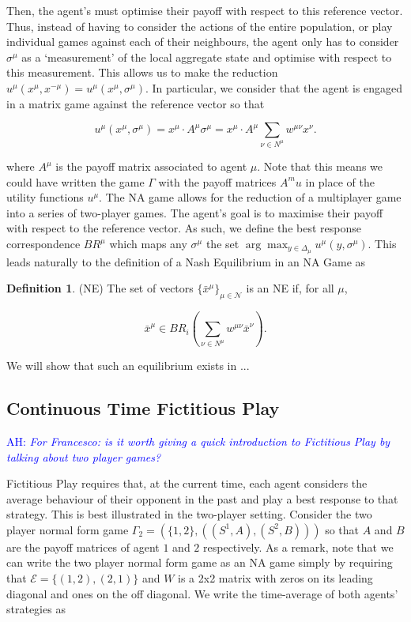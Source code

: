 \documentclass{article}
\theoremstyle{definition}
\newtheorem*{definition}{Definition}
\newcommand{\ah}[1]{\textcolor{blue}{AH: \textit{#1}}}
\newcommand{\agentset}{\mathcal{N}}
\newcommand{\edgeset}{\mathcal{E}}
\newcommand{\weightset}{W}
\newcommand{\utility}[1]{u^{#1}}
\newcommand{\wmunu}{w^{\mu \nu}}
\newcommand{\xmu}{x^{\mu}}
\newcommand{\xnu}{x^{\nu}}
\newcommand{\refmu}{\sigma^{\mu}}
\newcommand{\NE}[1]{\bar{x}^{#1}}
\newcommand{\weightedsum}{ \sum_{\nu \in N^\mu} \wmunu \xnu}
\newcommand{\xnotmu}{x^{-\mu}}
\begin{document}
	Then, the agent's must optimise their payoff with respect to this reference vector. Thus,
	instead of having to consider the actions of the entire population, or play individual games
	against each of their neighbours, the agent only has to consider $\sigma^\mu$ as a `measurement'
	of the local aggregate state and optimise with respect to this measurement. This allows us to
	make the reduction $u^\mu(\xmu, \xnotmu) = u^\mu(\xmu, \refmu)$. In particular, we consider that
	the agent is engaged in a matrix game against the reference vector so that

	\begin{equation}
		u^\mu(\xmu, \refmu) = \xmu \cdot A^\mu \refmu = \xmu \cdot A^\mu \weightedsum.
	\end{equation}

	where $A^\mu$ is the payoff matrix associated to agent $\mu$. Note that this means we could have
	written the game $\Gamma$ with the payoff matrices $A^mu$ in place of the utility functions
	$\utility{\mu}$. The NA game allows for the reduction of a
	multiplayer game into a series of two-player games. The agent's goal is to maximise their payoff
	with respect to the reference vector. As such, we define the best response correspondence
	$BR^\mu$ which maps any $\refmu$ the set $\arg \max_{y \in \Delta_\mu} {u^\mu(y, \refmu)}$. This
	leads naturally to the definition of a Nash Equilibrium in an NA Game as

	\begin{definition}(NE)
		The set of vectors $\{ \NE{\mu}\}_{\mu \in \agentset}$ is an NE if, for all $\mu$,
		
		\begin{equation*}
		\NE{\mu} \in BR_i( \sum_{\nu \in N^\mu} \wmunu \NE{\nu}).
		\end{equation*}
		
	\end{definition}

	We will show that such an equilibrium exists in ...

	\subsection{Continuous Time Fictitious Play}
	\label{sec::CTFP}

	\ah{For Francesco: is it worth giving a quick introduction to Fictitious Play by talking about two player games?}

	Fictitious Play requires that, at the current time, each agent considers the average behaviour
	of their opponent in the past and play a best response to that strategy. This is best
	illustrated in the two-player setting. Consider the two player normal form game $\Gamma_2 = (\{
	1, 2\}, ((S^1, A), (S^2, B)))$ so that $A$ and $B$ are the payoff matrices of agent $1$ and $2$
	respectively. As a remark, note that we can write the two player normal form game as an NA game
	simply by requiring that $\edgeset = \{(1, 2), (2, 1)\}$ and $\weightset$ is a 2x2 matrix with
	zeros on its leading diagonal and ones on the off diagonal. We write the time-average of both
	agents' strategies as 
\end{document}
